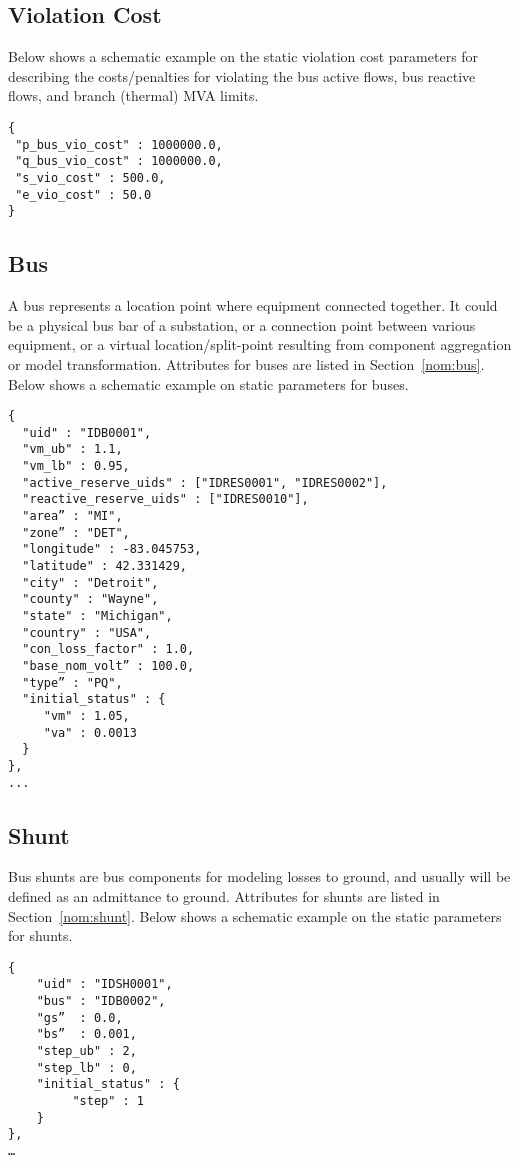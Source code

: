 \subsection{Violation Cost}
\label{sec:violation}
Below shows a schematic example on the static violation cost parameters for 
describing the costs/penalties for violating the bus active flows, bus reactive flows, 
and branch (thermal) MVA limits. 

\begin{verbatim}
{
 "p_bus_vio_cost" : 1000000.0,
 "q_bus_vio_cost" : 1000000.0,
 "s_vio_cost" : 500.0,
 "e_vio_cost" : 50.0
}
\end{verbatim}


\subsection{Bus}
\label{sec:bus}
A bus represents a location point where equipment connected together.
It could be a physical bus bar of a substation, or 
a connection point between various equipment, 
or a virtual location/split-point resulting from
component aggregation or model transformation.
Attributes for buses are listed in Section~\ref{nom:bus}.
Below shows a schematic example on static parameters for buses.
\begin{verbatim}
{
  "uid" : "IDB0001",
  "vm_ub" : 1.1,
  "vm_lb" : 0.95,
  "active_reserve_uids" : ["IDRES0001", "IDRES0002"],
  "reactive_reserve_uids" : ["IDRES0010"],
  "area” : "MI",
  "zone” : "DET",
  "longitude" : -83.045753,
  "latitude" : 42.331429,
  "city" : "Detroit",
  "county" : "Wayne",
  "state" : "Michigan",
  "country" : "USA",
  "con_loss_factor" : 1.0,
  "base_nom_volt” : 100.0,
  "type” : "PQ",
  "initial_status" : {
     "vm" : 1.05,
     "va" : 0.0013
  }
},
...
\end{verbatim}


\subsection{Shunt}
\label{sec:shunt}
Bus shunts are bus components for modeling losses to ground, and 
usually will be defined as an admittance to ground.
Attributes for shunts are listed in Section~\ref{nom:shunt}.
Below shows a schematic example on the static parameters for shunts.
\begin{verbatim}
{
    "uid" : "IDSH0001",
    "bus" : "IDB0002",
    "gs”  : 0.0,
    "bs”  : 0.001,
    "step_ub" : 2,
    "step_lb" : 0,
    "initial_status" : {
         "step" : 1
    }
},
…    
\end{verbatim}



